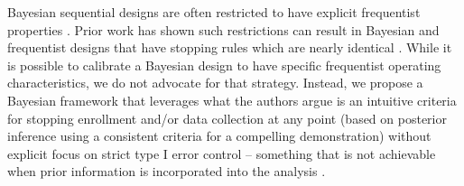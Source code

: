 \documentclass[12pt]{article}
\begin{document}
Bayesian sequential designs are often restricted to have explicit frequentist properties \citep{Ventz2015, Zhu2015}. 
Prior work has shown such restrictions can result in Bayesian and frequentist designs that have stopping rules which are 
nearly identical \citep{Stallard2020, Kopp-Schneider2020, Zhu2019}.
While it is possible to calibrate a Bayesian design to have specific frequentist operating characteristics, we do not advocate
for that strategy.
Instead, we propose a Bayesian framework that leverages what the authors argue is an intuitive criteria for stopping enrollment 
and/or data collection at any point (based on posterior inference using a consistent criteria for a compelling demonstration) without 
explicit focus on strict type I error control -- something that is not achievable when prior information is incorporated into 
the analysis \citep{Psioda2018}.
\end{document}
